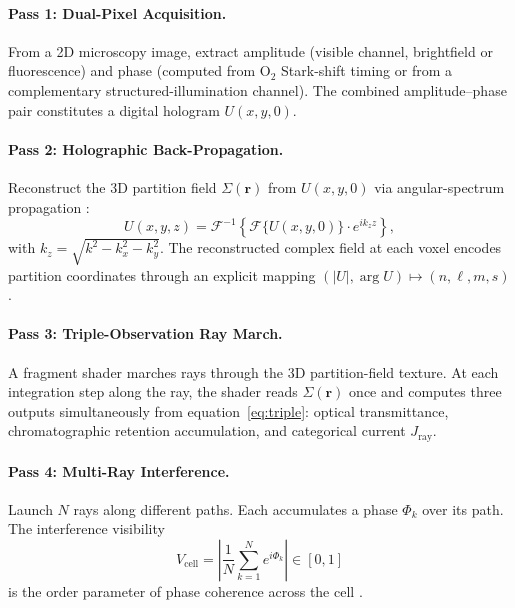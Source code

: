 \documentclass[twocolumn,10pt,a4paper]{article}
\theoremstyle{definition}
\theoremstyle{remark}
\begin{document}
\paragraph{Pass 1: Dual-Pixel Acquisition.} From a 2D microscopy image, extract amplitude (visible channel, brightfield or fluorescence) and phase (computed from O$_2$ Stark-shift timing or from a complementary structured-illumination channel). The combined amplitude--phase pair constitutes a digital hologram $U(x,y,0)$.

\paragraph{Pass 2: Holographic Back-Propagation.} Reconstruct the 3D partition field $\Sigma(\mathbf{r})$ from $U(x,y,0)$ via angular-spectrum propagation \citep{goodman_fourier_optics,schnars_juptner_2002,kim_2010}:
\begin{equation}
    U(x,y,z) = \mathcal{F}^{-1}\left\{\mathcal{F}\{U(x,y,0)\}\cdot e^{ik_z z}\right\},
    \label{eq:angspec}
\end{equation}
with $k_z = \sqrt{k^2 - k_x^2 - k_y^2}$. The reconstructed complex field at each voxel encodes partition coordinates through an explicit mapping $(|U|,\arg U)\mapsto(n,\ell,m,s)$.

\paragraph{Pass 3: Triple-Observation Ray March.} A fragment shader \citep{pharr_jakob_humphreys_2023,kajiya_1986,levoy_1988} marches rays through the 3D partition-field texture. At each integration step along the ray, the shader reads $\Sigma(\mathbf{r})$ once and computes three outputs simultaneously from equation~\eqref{eq:triple}: optical transmittance, chromatographic retention accumulation, and categorical current $J_{\mathrm{ray}}$.

\paragraph{Pass 4: Multi-Ray Interference.} Launch $N$ rays along different paths. Each accumulates a phase $\Phi_k$ over its path. The interference visibility
\begin{equation}
    V_{\mathrm{cell}} = \left|\frac{1}{N}\sum_{k=1}^N e^{i\Phi_k}\right|\in[0,1]
    \label{eq:Vcell}
\end{equation}
is the order parameter of phase coherence across the cell \citep{kuramoto_1975,strogatz_2000,acebron_2005}.
\end{document}
